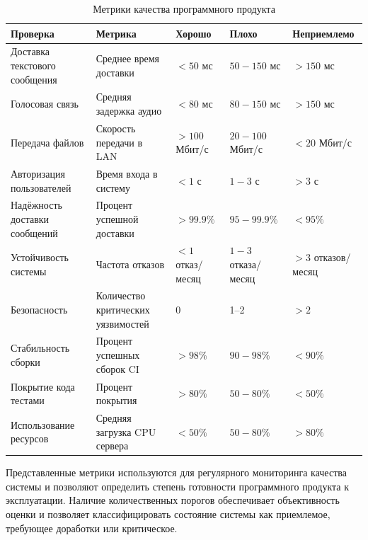 \documentclass[14pt,a4paper]{extarticle}
\begin{document}
\begin{table}[H]
\centering
\caption{Метрики качества программного продукта}
\begin{tabular}{|p{3.5cm}|p{3.2cm}|p{2.5cm}|p{2.5cm}|p{2.8cm}|}
\hline
\textbf{Проверка} &
\textbf{Метрика} &
\textbf{Хорошо} &
\textbf{Плохо} &
\textbf{Неприемлемо} \\
\hline

Доставка текстового сообщения &
Среднее время доставки &
$<50$ мс &
$50-150$ мс &
$>150$ мс \\
\hline

Голосовая связь &
Средняя задержка аудио &
$<80$ мс &
$80-150$ мс &
$>150$ мс \\
\hline

Передача файлов &
Скорость передачи в LAN &
$>100$ Мбит/с &
$20-100$ Мбит/с &
$<20$ Мбит/с \\
\hline

Авторизация пользователей &
Время входа в систему &
$<1$ с &
$1-3$ с &
$>3$ с \\
\hline

Надёжность доставки сообщений &
Процент успешной доставки &
$>99.9\%$ &
$95-99.9\%$ &
$<95\%$ \\
\hline

Устойчивость системы &
Частота отказов &
$<1$ отказ/месяц &
$1-3$ отказа/месяц &
$>3$ отказов/месяц \\
\hline

Безопасность &
Количество критических уязвимостей &
0 &
1--2 &
$>2$ \\
\hline

Стабильность сборки &
Процент успешных сборок CI &
$>98\%$ &
$90-98\%$ &
$<90\%$ \\
\hline

Покрытие кода тестами &
Процент покрытия &
$>80\%$ &
$50-80\%$ &
$<50\%$ \\
\hline

Использование ресурсов &
Средняя загрузка CPU сервера &
$<50\%$ &
$50-80\%$ &
$>80\%$ \\
\hline

\end{tabular}
\end{table}

Представленные метрики используются для регулярного мониторинга качества системы и позволяют определить степень готовности программного продукта к эксплуатации. Наличие количественных порогов обеспечивает объективность оценки и позволяет классифицировать состояние системы как приемлемое, требующее доработки или критическое.
\end{document}
